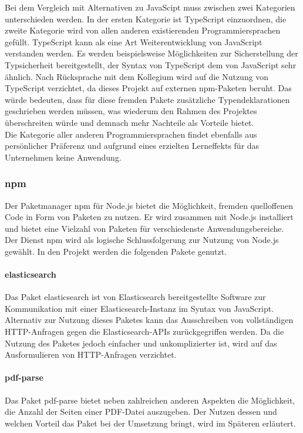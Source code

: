 \documentclass[a4paper]{scrartcl}
\begin{document}
Bei dem Vergleich mit Alternativen zu JavaScipt muss zwischen zwei Kategorien unterschieden werden. In der ersten Kategorie ist TypeScript einzuordnen, die zweite Kategorie wird von allen anderen existierenden Programmiersprachen gefüllt. TypeScript kann als eine Art Weiterentwicklung von JavaScript verstanden werden. Es werden beispielsweise Möglichkeiten zur Sicherstellung der Typsicherheit bereitgestellt, der Syntax von TypeScript dem von JavaScript sehr ähnlich. Nach Rücksprache mit dem Kollegium wird auf die Nutzung von TypeScript verzichtet, da dieses Projekt auf externen npm-Paketen beruht. Das würde bedeuten, dass für diese fremden Pakete zusätzliche Typendeklarationen geschrieben werden müssen, was wiederum den Rahmen des Projektes überschreiten würde und demnach mehr Nachteile als Vorteile bietet. \\
Die Kategorie aller anderen Programmiersprachen findet ebenfalls aus persönlicher Präferenz und aufgrund eines erzielten Lerneffekts für das Unternehmen keine Anwendung.

\subsubsection{npm}
Der Paketmanager npm für Node.js bietet die Möglichkeit, fremden quelloffenen Code in Form von Paketen zu nutzen. Er wird zusammen mit Node.js installiert und bietet eine Vielzahl von Paketen für verschiedenste Anwendungsbereiche.\\
Der Dienst npm wird als logische Schlussfolgerung zur Nutzung von Node.js gewählt. In den Projekt werden die folgenden Pakete genutzt.

\paragraph{elasticsearch}
Das Paket elasticsearch ist von Elasticsearch bereitgestellte Software zur Kommunikation mit einer Elasticsearch-Instanz im Syntax von JavaScript. \\
Alternativ zur Nutzung dieses Paketes kann das Ausschreiben von vollständigen HTTP-Anfragen gegen die Elasticsearch-APIs zurückgegriffen werden. Da die Nutzung des Paketes jedoch einfacher und unkomplizierter ist, wird auf das Ausformulieren von HTTP-Anfragen verzichtet.

\paragraph{pdf-parse}
Das Paket pdf-parse bietet neben zahlreichen anderen Aspekten die Möglichkeit, die Anzahl der Seiten einer PDF-Datei auszugeben. Der Nutzen dessen und welchen Vorteil das Paket bei der Umsetzung bringt, wird im Späteren erläutert.
\end{document}
